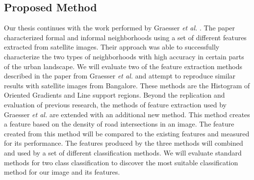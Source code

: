 

 
\subsection{Proposed Method}

Our thesis continues with the work performed by Graesser \textit{et al.} \cite{graesser2012image}. The paper characterized formal and informal neighborhoods using a set of different features extracted from satellite images. Their approach was able to successfully characterize the two types of neighborhoods with high accuracy in certain parts of the urban landscape. We will evaluate two of the feature extraction methods described in the paper from Graesser \textit{et al.} and attempt to reproduce similar results with satellite images from Bangalore. These methods are the Histogram of Oriented Gradients and Line support regions. Beyond the replication and evaluation of previous research, the methods of feature extraction used by Graesser \textit{et al.} are extended with an additional new method. This method creates a feature based on the density of road intersections in an image. The feature created from this method will be compared to the existing features and measured for its performance. The features produced by the three methods will combined and used by a set of different classification methods. We will evaluate standard methods for two class classification to discover the most suitable classification method for our image and its features. 

